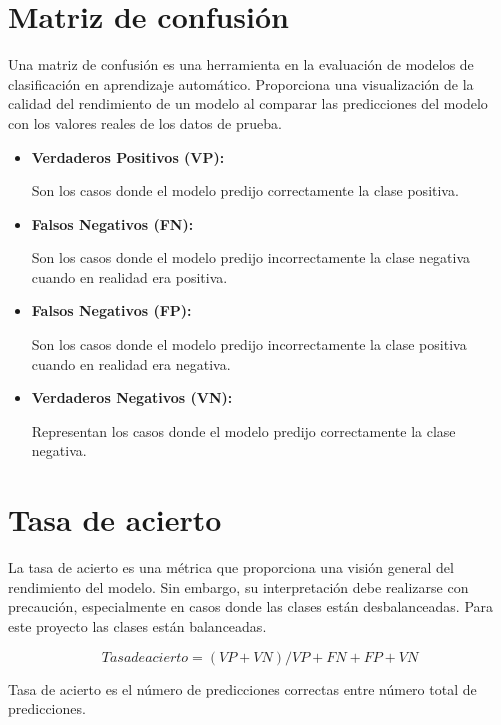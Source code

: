 \section{Matriz de confusión}

Una matriz de confusión es una herramienta en la evaluación de modelos de clasificación en aprendizaje automático. Proporciona una visualización de la calidad del rendimiento de un modelo al comparar las predicciones del modelo con los valores reales de los datos de prueba.

\begin{itemize}

	\item
	\textbf{Verdaderos Positivos (VP):}
	
	Son los casos donde el modelo predijo correctamente la clase positiva.
	
	\item
	\textbf{Falsos Negativos (FN):}
	
	Son los casos donde el modelo predijo incorrectamente la clase negativa cuando en realidad era positiva.
	
	\item
	\textbf{Falsos Negativos (FP):}
	
	Son los casos donde el modelo predijo incorrectamente la clase positiva cuando en realidad era negativa.
	
	\item
	\textbf{Verdaderos Negativos (VN):}
	
	Representan los casos donde el modelo predijo correctamente la clase negativa.

\end{itemize}


\section{Tasa de acierto}

La tasa de acierto es una métrica que proporciona una visión general del rendimiento del modelo. Sin embargo, su interpretación debe realizarse con precaución, especialmente en casos donde las clases están desbalanceadas. Para este proyecto las clases están balanceadas.



	\begin{equation*}
	Tasa de acierto = (VP + VN) / VP + FN + FP + VN
	\end{equation*}
	
	Tasa de acierto es el número de predicciones correctas entre número total de predicciones.
